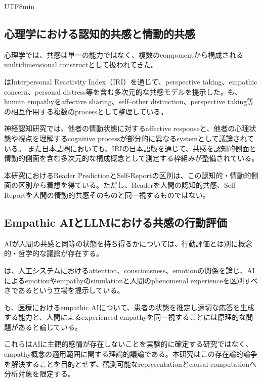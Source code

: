\documentclass{article} %
\begin{document}
\begin{CJK*}{UTF8}{min}
\subsection{心理学における認知的共感と情動的共感}

心理学では、共感は単一の能力ではなく、複数のcomponentから構成されるmultidimensional constructとして扱われてきた。

\citet{davis1983measuring}はInterpersonal Reactivity Index（IRI）を通じて、perspective taking、empathic concern、personal distress等を含む多次元的な共感モデルを提示した\citep{davis1983measuring}。\citet{decety2004functional}も、human empathyをaffective sharing、self--other distinction、perspective taking等の相互作用する複数のprocessとして整理している\citep{decety2004functional}。

神経認知研究では、他者の情動状態に対するaffective responseと、他者の心理状態や視点を理解するcognitive processが部分的に異なるsystemとして議論されている\citep{singer2009social,shamay2011neural}。
また日本語圏においても、IRIの日本語版を通じて、共感を認知的側面と情動的側面を含む多次元的な構成概念として測定する枠組みが整備されている\citep{himichi2017development}。

本研究におけるReader PredictionとSelf-Reportの区別は、この認知的・情動的側面の区別から着想を得ている。ただし、Readerを人間の認知的共感、Self-Reportを人間の情動的共感そのものと同一視するものではない。


\subsection{Empathic AIとLLMにおける共感の行動評価}

AIが人間の共感と同等の状態を持ち得るかについては、行動評価とは別に概念的・哲学的な議論が存在する。

\citet{haladjian2016artificial}は、人工システムにおけるattention、consciousness、emotionの関係を論じ、AIによるemotionやempathyのsimulationと人間のphenomenal experienceを区別すべきであるという立場を提示している\citep{haladjian2016artificial}。

\citet{montemayor2022principle}も、医療におけるempathic AIについて、患者の状態を推定し適切な応答を生成する能力と、人間によるexperienced empathyを同一視することには原理的な問題があると論じている\citep{montemayor2022principle}。

これらはAIに主観的感情が存在しないことを実験的に確定する研究ではなく、empathy概念の適用範囲に関する理論的議論である。本研究はこの存在論的論争を解決することを目的とせず、観測可能なrepresentationとcausal computationへ分析対象を限定する。


\end{CJK*}
\end{document}
